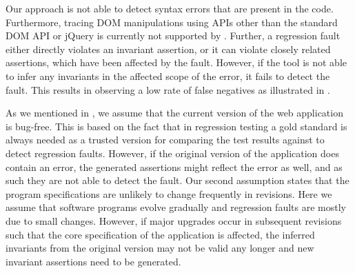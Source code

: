  Our approach is not able to detect syntax errors that are present in the \javascript code. Furthermore, tracing DOM manipulations using APIs other than the standard DOM API or jQuery is currently not supported by \jsart.
Further, a regression fault either directly violates an invariant assertion, or it can violate closely 
related assertions, which have been affected by the fault. However, if the tool is not able to infer any invariants in the  affected scope of the error, it fails to detect the fault. This results in observing a low rate of false negatives as illustrated in . 
     
 As we mentioned in , we assume that the current version of the web application is bug-free. This is based on the fact that in regression testing a gold standard is always needed as a trusted version for comparing the test results against \cite{Binder:2000} to detect regression faults. However, if the original version of the application does contain an error, the generated assertions might reflect the error as well, and as such they are not able to detect the fault. 
Our second assumption states that the program specifications are unlikely to change frequently in revisions. Here we assume that software programs evolve gradually and regression faults are mostly due to small changes. However, if major upgrades occur in subsequent revisions such that the core specification of the application is affected, the inferred invariants from the original version may not be valid any longer and new invariant assertions need to be generated.



 

